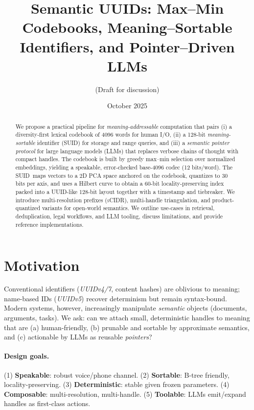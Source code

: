 \documentclass[11pt]{article}
\title{Semantic UUIDs: Max--Min Codebooks, Meaning--Sortable Identifiers, and Pointer--Driven LLMs}
\author{(Draft for discussion)}
\date{October 2025}
\newcommand{\suid}{\textsc{SUID}}
\newcommand{\scidr}{\textsc{sCIDR}}
\begin{document}
\maketitle

\begin{abstract}
We propose a practical pipeline for \emph{meaning-addressable} computation that pairs (i) a diversity-first lexical codebook of 4096 words for human I/O, (ii) a 128-bit \emph{meaning-sortable} identifier (\suid) for storage and range queries, and (iii) a \emph{semantic pointer protocol} for large language models (LLMs) that replaces verbose chains of thought with compact handles. The codebook is built by greedy max--min selection over normalized embeddings, yielding a speakable, error-checked base-4096 codec (12 bits/word). The \suid\ maps vectors to a 2D PCA space anchored on the codebook, quantizes to 30 bits per axis, and uses a Hilbert curve to obtain a 60-bit locality-preserving index packed into a UUID-like 128-bit layout together with a timestamp and tiebreaker. We introduce multi-resolution prefixes (\scidr), multi-handle triangulation, and product-quantized variants for open-world semantics. We outline use-cases in retrieval, deduplication, legal workflows, and LLM tooling, discuss limitations, and provide reference implementations.
\end{abstract}

\section{Motivation}
Conventional identifiers (\emph{UUIDv4/7}, content hashes) are oblivious to meaning; name-based IDs (\emph{UUIDv5}) recover determinism but remain syntax-bound. Modern systems, however, increasingly manipulate \emph{semantic} objects (documents, arguments, tasks). We ask: can we attach small, deterministic handles to meaning that are (a) human-friendly, (b) prunable and sortable by approximate semantics, and (c) actionable by LLMs as reusable \emph{pointers}?

\paragraph{Design goals.} (1) \textbf{Speakable}: robust voice/phone channel. (2) \textbf{Sortable}: B-tree friendly, locality-preserving. (3) \textbf{Deterministic}: stable given frozen parameters. (4) \textbf{Composable}: multi-resolution, multi-handle. (5) \textbf{Toolable}: LLMs emit/expand handles as first-class actions.
\end{document}

